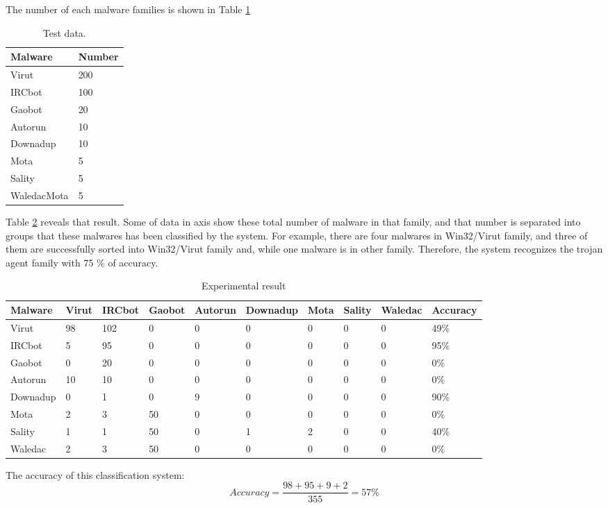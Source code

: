  The number of each malware families is shown in Table \ref{table:testdata}
 \begin{table}
  \begin{center}
    \begin{tabular}{ | l | l |}
     \hline
    Malware & Number\\ \hline
    Virut & 200\\ \hline
	IRCbot & 100\\ \hline
	Gaobot  & 20\\ \hline
	Autorun & 10\\ \hline
	Downadup &  10\\ \hline
	Mota & 5\\ \hline
	Sality  & 5  \\ \hline
	WaledacMota & 5\\ \hline
    \end{tabular}
	\end{center}
     \caption{Test data.}
      \label{table:testdata}
\end{table}
Table \ref{table:experimentalresult} reveals that result. Some of data in axis show these total number of malware in that family, and that number is separated into groups that these malwares has been classified by the system. For example, there are four malwares in Win32/Virut family, and three of them are successfully sorted into Win32/Virut family and, while one malware is in other family. Therefore, the system recognizes the trojan agent family with 75 \% of accuracy.
\begin{table}
  \begin{center}
    \begin{tabular}{ | l | l | l | l | l | l | l | l | l | l |}
     \hline
    Malware & Virut & IRCbot& Gaobot &  Autorun & Downadup  & Mota & Sality & Waledac & Accuracy\\ \hline
    Virut & 98 & 102 & 0 & 0 & 0 & 0  & 0  & 0 & 49\%\\ \hline
    IRCbot & 5 & 95 & 0 & 0 & 0 & 0  & 0  & 0 & 95\%\\ \hline    
	Gaobot & 0 & 20 & 0 & 0 & 0 & 0  & 0  & 0 & 0\%\\ \hline
	Autorun & 10 & 10 & 0 & 0 & 0 & 0  & 0  & 0 & 0\%\\ \hline	
	Downadup & 0 & 1 & 0 & 9 & 0 & 0  & 0  & 0 & 90\%\\ \hline
	Mota  & 2 & 3 & 50 & 0 & 0 & 0  & 0  & 0 & 0\%\\ \hline
	Sality  & 1 & 1 & 50 & 0 & 1 & 2  & 0  & 0 & 40\%\\ \hline	
	Waledac & 2 & 3 & 50 & 0 & 0 & 0  & 0  & 0 & 0\% \\ \hline
    \end{tabular}
	\end{center}
     \caption{Experimental result}
    \label{table:experimentalresult}
\end{table}
The accuracy of this classification system:
\begin{equation}
Accuracy=\frac{98+95+9+2}{355}=57\%
\end{equation}

